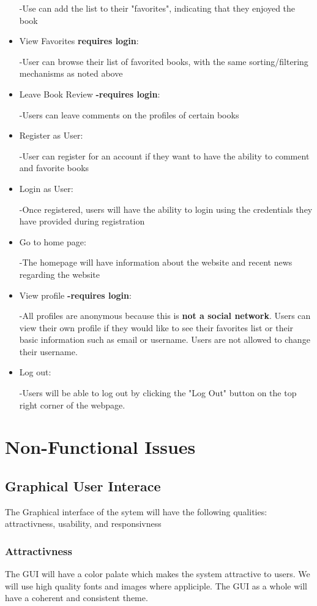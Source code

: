 \documentclass[letter, 12pt, titlepage]{article}
\begin{document}
\begin{itemize}
		-Use can add the list to their "favorites", indicating that they enjoyed the book
	\item View Favorites  \textbf{requires login}:

		-User can browse their list of favorited books, with the same sorting/filtering mechanisms as noted above

	\item Leave Book Review \textbf{-requires login}: 

		-Users can leave comments on the profiles of certain books
	\item Register as User:

		-User can register for an account if they want to have the ability to comment and favorite books

	\item Login as User:

		-Once registered, users will have the ability to login using the credentials they have provided during registration
	\item Go to home page:

		-The homepage will have information about the website and recent news regarding the website
	\item View profile \textbf{-requires login}:

		-All profiles are anonymous because this is \textbf{not a social network}. Users can view their own profile if they would like to see their favorites list or their basic information such as email or username. Users are not allowed to change their username.

	\item Log out:

		-Users will be able to log out by clicking the "Log Out" button on the top right corner of the webpage.

	
	\end{itemize}	
		
		
	\section{Non-Functional Issues}

		\subsection{Graphical User Interace}
			The Graphical interface of the sytem will have the following qualities: attractivness, usability, and responsivness
			\subsubsection{Attractivness}
				The GUI will have a color palate which makes the system attractive to users. We will use high quality fonts and images where appliciple. The GUI as a whole will have a coherent and consistent theme. 
\end{document}
